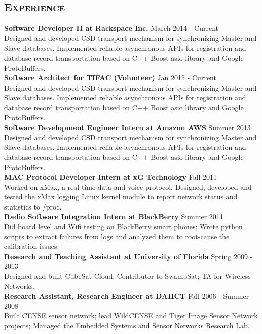 \begin{resume}
\section{\textsc{Experience}}
\textbf{Software Developer II at Rackspace Inc.} \hfill March 2014 - Current\\
Designed and developed CSD transport mechanism for synchronizing  Master and Slave databases. Implemented reliable asynchronous APIs for registration and database record transportation based on C++ Boost asio library and Google ProtoBuffers.\\
\textbf{Software Architect for TIFAC (Volunteer)} \hfill Jan 2015 - Current\\
Designed and developed CSD transport mechanism for synchronizing  Master and Slave databases. Implemented reliable asynchronous APIs for registration and database record transportation based on C++ Boost asio library and Google ProtoBuffers.\\
\textbf{Software Development Engineer Intern at Amazon AWS} \hfill Summer 2013 \\
Designed and developed CSD transport mechanism for synchronizing  Master and Slave databases. Implemented reliable asynchronous APIs for registration and database record transportation based on C++ Boost asio library and Google ProtoBuffers.\\
\textbf{MAC Protocol Developer Intern at xG Technology} \hfill Fall 2011 \\
Worked on xMax, a real-time data and voice protocol. Designed, developed and tested the xMax logging Linux kernel module to report network status and statistics to /proc.\\
\textbf{Radio Software Integration Intern at BlackBerry} \hfill Summer 2011 \\
Did board level and Wifi testing on BlackBerry smart phones; Wrote python scripts to extract failures from logs and analyzed them to root-cause the calibration issues.\\
\textbf{Research and Teaching Assistant at University of Florida} \hfill Spring 2009 - 2013\\
Designed and built CubeSat Cloud; Contributor to SwampSat; TA for Wireless Networks.\\
\textbf{Research Assistant, Research Engineer at DAIICT} \hfill Fall 2006 - Summer 2008 \\
Built CENSE sensor network; lead WildCENSE and Tiger Image Sensor Network projects; Managed the Embedded Systems and Sensor Networks Research Lab.


\end{resume}
